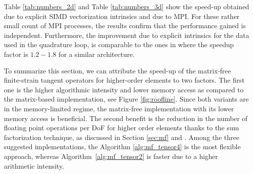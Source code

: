 \documentclass[AMA,STIX1COL]{WileyNJD-v2}
\begin{document}
\begin{table}
  \centering
  \caption{Wall-clock time in seconds and performance in GFlops of Algorithm \ref{alg:mf_tensor4} in 3D for various combinations of polynomial degrees,
  vectorization and parallelization.}
  \label{tab:numbers_3d}
\end{table}

Table \ref{tab:numbers_2d} and Table \ref{tab:numbers_3d} show the speed-up obtained due to explicit SIMD vectorization intrinsics and due to MPI. For these rather small count of MPI processes, the results confirm that the performance gained is independent. Furthermore, the improvement due to explicit intrinsics for the data used in the quadrature loop, is comparable to the ones in \cite[Figure 6]{kronbichler2017fastcomputer} where the speedup factor is $1.2-1.8$ for a similar architecture.

To summarize this section, we can attribute the speed-up of the matrix-free finite-strain tangent operators for higher-order elements to two factors.
{\color{red}
The first one is the higher algorithmic intensity and lower memory access as compared to the matrix-based implementation, see Figure \ref{fig:roofline}. Since both variants are in the memory-limited regime, the matrix-free implementation with its lower memory access is beneficial.
}
The second benefit is the reduction in the number of floating point operations per DoF for higher order elements thanks to the sum factorization technique, as discussed in
Section \ref{sec:mf} and \cite[Section 2.4]{kronbichler12}.
Among the three suggested implementations, the Algorithm \ref{alg:mf_tensor4} is the most flexible approach, whereas Algorithm~\ref{alg:mf_tensor2} is faster due to a higher arithmetic intensity.
\end{document}
